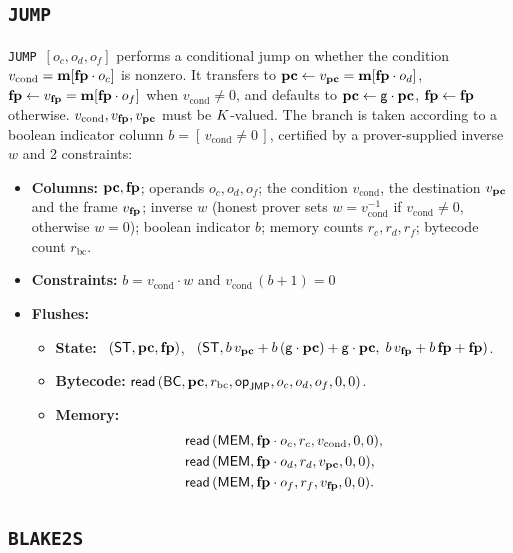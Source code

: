 \subsection{\texttt{JUMP}}\label{sec:tab-jump}

\texttt{JUMP}\ $[o_c,o_d,o_f]$ performs a conditional jump on whether the condition $v_{\mathrm{cond}}=\mathbf{m}[\mathbf{fp}\cdot o_c]$ is nonzero. It transfers to $\mathbf{pc}\gets v_{\mathbf{pc}} = \mathbf{m}[\mathbf{fp}\cdot o_d]$, $\mathbf{fp}\gets v_{\mathbf{fp}} = \mathbf{m}[\mathbf{fp}\cdot o_f]$ when $v_{\mathrm{cond}}\neq0$, and defaults to $\mathbf{pc}\gets\mathsf{g}\cdot\mathbf{pc}$, $\mathbf{fp}\gets\mathbf{fp}$ otherwise. $v_{\mathrm{cond}}, v_{\mathbf{fp}}, v_{\mathbf{pc}}$ must be $K$-valued. The branch is taken according to a boolean indicator column $b=[\,v_{\mathrm{cond}}\neq0\,]$, certified by a prover-supplied inverse $w$ and 2 constraints:

\begin{itemize}
\item \textbf{Columns:} $\mathbf{pc},\mathbf{fp}$; operands $o_c,o_d,o_f$; the condition $v_{\mathrm{cond}}$, the destination $v_{\mathbf{pc}}$ and the frame $v_{\mathbf{fp}}$; inverse $w$ (honest prover sets $w = v_{\mathrm{cond}}^{-1}$ if $v_{\mathrm{cond}}\neq0$, otherwise $w=0$); boolean indicator $b$; memory counts $r_c,r_d,r_f$; bytecode count $r_{\mathrm{bc}}$.
\item \textbf{Constraints:}  $b=v_{\mathrm{cond}}\cdot w$ and $v_{\mathrm{cond}}\,(b+1)=0$
\item \textbf{Flushes:}
  \begin{itemize}
  \item \textbf{State:} \pull\ $( \mathsf{ST},\mathbf{pc},\mathbf{fp} )$, \push\ $( \mathsf{ST},b\,v_{\mathbf{pc}}+b\,(\mathsf{g}\cdot\mathbf{pc})+\mathsf{g}\cdot\mathbf{pc},\;b\,v_{\mathbf{fp}}+b\,\mathbf{fp}+\mathbf{fp} )$.
  \item \textbf{Bytecode:} $\mathsf{read}\,( \mathsf{BC},\mathbf{pc},r_{\mathrm{bc}},\mathsf{op}_{\mathsf{JMP}},o_c,o_d,o_f,0,0 )$.
  \item \textbf{Memory:}
    \begin{align*}
      &\mathsf{read}\,( \mathsf{MEM},\mathbf{fp}\cdot o_c,r_c,v_{\mathrm{cond}},0,0 ),\\
      &\mathsf{read}\,( \mathsf{MEM},\mathbf{fp}\cdot o_d,r_d,v_{\mathbf{pc}},0,0 ),\\
      &\mathsf{read}\,( \mathsf{MEM},\mathbf{fp}\cdot o_f,r_f,v_{\mathbf{fp}},0,0 ).
    \end{align*}
  \end{itemize}
\end{itemize}

\subsection{\texttt{BLAKE2S}}\label{sec:tab-blake2s}

